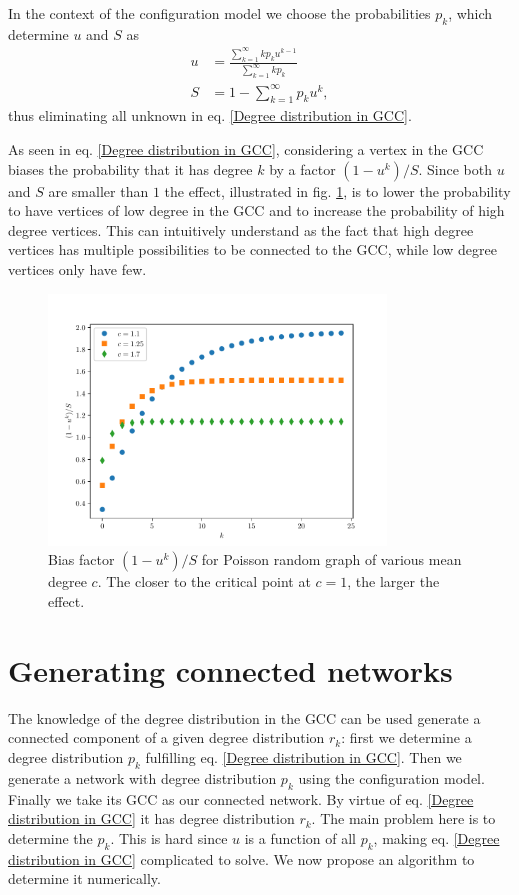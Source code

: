 \documentclass[a4paper]{article}
\begin{document}
In the context of the configuration model we choose the probabilities $p_k$, which determine $u$ and $S$ as
\begin{align}
	u &= \frac{\sum_{k=1}^\infty k p_k u^{k-1}}{\sum_{k=1}^\infty k p_k} \\
	S &= 1 - \sum_{k=1}^\infty p_k u^{k},
\end{align}
thus eliminating all unknown in eq. \eqref{Degree distribution in GCC}.

As seen in eq. \eqref{Degree distribution in GCC}, considering a vertex in the GCC biases the probability that it has degree $k$ by a factor $(1 - u^k)/S$. Since both $u$ and $S$ are smaller than $1$ the effect, illustrated in fig. \ref{Figure: low degree saturation}, is to lower the probability to have vertices of low degree in the GCC and to increase the probability of high degree vertices. This can intuitively understand as the fact that high degree vertices has multiple possibilities to be connected to the GCC, while low degree vertices only have few.

\begin{figure}
	\includegraphics[width=0.8\textwidth]{drift_term.pdf}
	\caption{Bias factor $(1 - u^k)/S$ for Poisson random graph of various mean degree $c$. The closer to the critical point at $c = 1$, the larger the effect.}
	\label{Figure: low degree saturation}
\end{figure}

\section{Generating connected networks}

The knowledge of the degree distribution in the GCC can be used generate a connected component of a given degree distribution $r_k$: first we determine a degree distribution $p_k$ fulfilling eq. \eqref{Degree distribution in GCC}. Then we generate a network with degree distribution $p_k$ using the configuration model. Finally we take its GCC as our connected network. By virtue of eq. \eqref{Degree distribution in GCC} it has degree distribution $r_k$. The main problem here is to determine the $p_k$. This is hard since $u$ is a function of all $p_k$, making eq. \eqref{Degree distribution in GCC} complicated to solve. We now propose an algorithm to determine it numerically.
\end{document}
